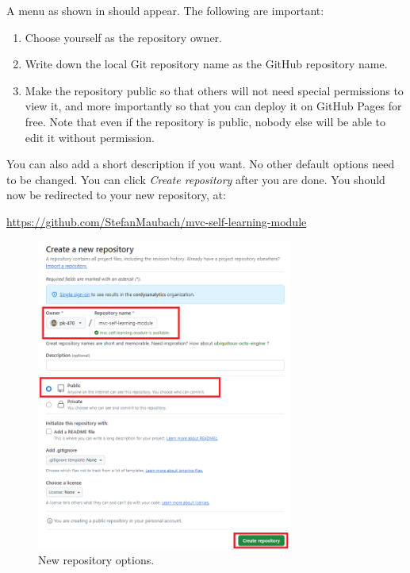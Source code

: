 \documentclass[a4paper,10pt]{article}
\begin{document}
A menu as shown in  should appear. The following are important:
\begin{enumerate}
    \item Choose yourself as the repository owner.
    \item Write down the local Git repository name as the GitHub repository name.
    \item Make the repository public so that others will not need special permissions to view it, and more importantly so that you can deploy it on GitHub Pages for free. Note that even if the repository is public, nobody else will be able to edit it without permission.
\end{enumerate}
You can also add a short description if you want. No other default options need to be changed. You can click \emph{Create repository} after you are done. You should now be redirected to your new repository, at:

\url{https://github.com/StefanMaubach/mvc-self-learning-module}

\begin{figure}[htbp]
    \centering
    \includegraphics[width=0.75\textwidth]{new_repository_options.png}
    \caption{New repository options.}
    \label{fig:new_repository_options}   
\end{figure}
\end{document}

